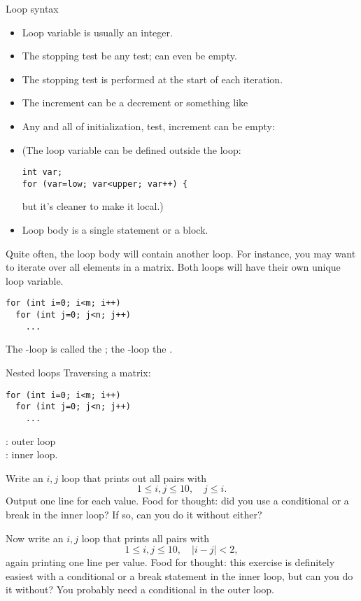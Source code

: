 \begin{slide}{Loop syntax}
  \label{sl:for-syntax}
  \begin{itemize}
  \item Loop variable is usually an integer.
  \item The stopping test be any test; can even be empty.
  \item The stopping test is performed at the start of each iteration.
  \item The increment can be a decrement or something like 
  \item Any and all of initialization, test, increment can be empty:\\
  \item (The loop variable can be defined outside the loop:
\begin{verbatim}
int var;
for (var=low; var<upper; var++) {
\end{verbatim}
but it's cleaner to make it local.)
\item Loop body is a single statement or a block.
  \end{itemize}
\end{slide}

Quite often, the loop body will contain another loop. For instance,
you may want to iterate over all elements in a matrix. Both loops will
have their own unique loop variable.
\begin{verbatim}
for (int i=0; i<m; i++)
  for (int j=0; j<n; j++)
    ...
\end{verbatim}
The -loop is called the ; the
-loop the .

\begin{slide}{Nested loops}
  \label{sl:for-nest}
  Traversing a matrix:
\begin{verbatim}
for (int i=0; i<m; i++)
  for (int j=0; j<n; j++)
    ...
\end{verbatim}
: outer loop\\
: inner loop.
\end{slide}

\begin{exercise}
  \label{ex:ij-triangle}
  Write an $i,j$ loop that prints out all pairs with
  \[ 1\leq i,j\leq 10,\quad  j\leq i. \]
  Output one line for each  value. Food for thought: did you use a
  conditional or a break in the inner loop? If so, can you do it without either?

  Now write an $i,j$ loop that prints all pairs with
  \[ 1\leq i,j\leq 10,\quad |i-j|<2, \]
  again printing one line per  value.
  Food for thought: this exercise is definitely easiest with a
  conditional or a break statement in the inner loop, but can you do
  it without? You probably need a conditional in the outer loop.
\end{exercise}

